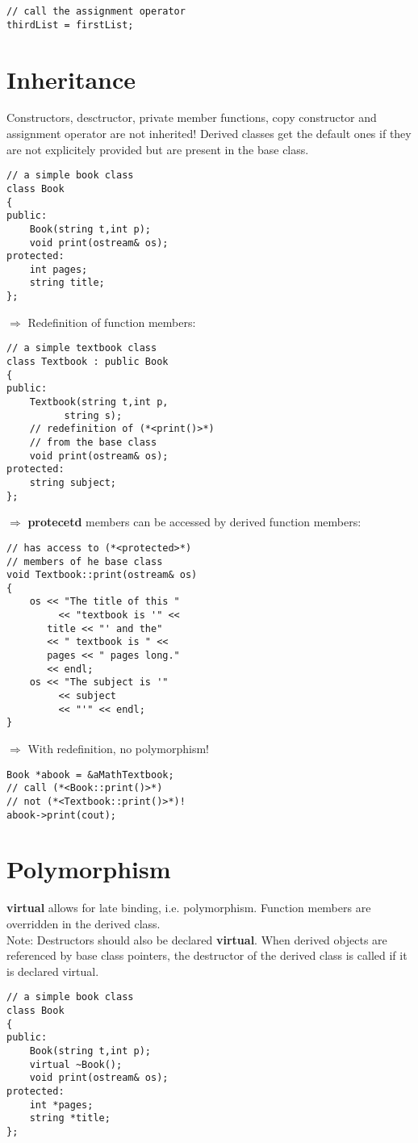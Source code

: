 \documentclass[10pt]{article}
\begin{document}
\begin{multicols*}{3}
\begin{lstlisting}
// call the assignment operator
thirdList = firstList;
\end{lstlisting}
%
%
\section*{Inheritance}
\small
Constructors, desctructor, private member functions, copy constructor
and assignment operator are not inherited! Derived classes get the default ones
if they are not explicitely provided but are present in the base class.
\begin{lstlisting}
// a simple book class
class Book
{
public:
    Book(string t,int p);
    void print(ostream& os);
protected:
    int pages;
    string title;
};
\end{lstlisting}
$\Rightarrow$ Redefinition of function members:
\begin{lstlisting}
// a simple textbook class
class Textbook : public Book
{
public:
    Textbook(string t,int p,
          string s);
    // redefinition of (*<print()>*) 
    // from the base class
    void print(ostream& os);
protected:
    string subject;
};
\end{lstlisting}
$\Rightarrow$ \textbf{protecetd} members can be accessed
by derived function members:
\begin{lstlisting}
// has access to (*<protected>*) 
// members of he base class
void Textbook::print(ostream& os)
{
    os << "The title of this "
         << "textbook is '" <<
       title << "' and the"
       << " textbook is " <<
       pages << " pages long." 
       << endl;
    os << "The subject is '" 
         << subject
         << "'" << endl;
}
\end{lstlisting}
$\Rightarrow$ With redefinition, no polymorphism!
\begin{lstlisting}
Book *abook = &aMathTextbook;
// call (*<Book::print()>*)
// not (*<Textbook::print()>*)!
abook->print(cout);
\end{lstlisting}
%
%
\section*{Polymorphism}
\small
\textbf{virtual} allows for late binding, i.e.
polymorphism. Function members are
overridden in the derived class.\\
Note: Destructors should also be
declared \textbf{virtual}. When derived
objects are referenced by base class
pointers, the destructor of the derived class
is called if it is declared virtual.
\begin{lstlisting}
// a simple book class
class Book
{
public:
    Book(string t,int p);
    virtual ~Book();
    void print(ostream& os);
protected:
    int *pages;
    string *title;
};


\end{lstlisting}
\end{multicols*}
\end{document}

